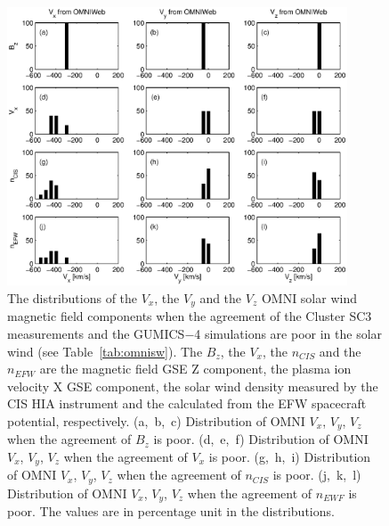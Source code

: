 \documentclass[linenumbers,draft]{agujournal}
\begin{document}
\begin{figure}[h]
\centering
\includegraphics[width=0.9\textwidth,angle=0]{swe-2020-corr-f15.eps}
\caption{The distributions of the $V_{x}$, the $V_{y}$  and the $V_{z}$ OMNI solar wind magnetic field components when the agreement of the Cluster SC3 measurements and the GUMICS$-$4 simulations are poor in the solar wind (see Table~\ref{tab:omnisw}). The $B_{z}$, the $V_{x}$, the $n_{CIS}$ and the $n_{EFW}$ are the magnetic field GSE Z component, the plasma ion velocity X GSE component, the  solar wind density measured by the CIS HIA instrument and the calculated from the EFW spacecraft potential, respectively. (a,~b,~c) Distribution of OMNI $V_{x}$, $V_{y}$, $V_{z}$ when the agreement of $B_{z}$ is poor. (d,~e,~f) Distribution of OMNI  $V_{x}$, $V_{y}$, $V_{z}$ when the agreement of $V_{x}$ is poor. (g,~h,~i) Distribution of OMNI $V_{x}$, $V_{y}$, $V_{z}$ when the agreement of $n_{CIS}$ is poor. (j,~k,~l) Distribution of OMNI $V_{x}$, $V_{y}$, $V_{z}$ when the agreement of $n_{EWF}$ is poor. The values are in percentage unit in the distributions.}
\label{fig:swomnivxyz}
\end{figure}

\pagebreak
\end{document}
